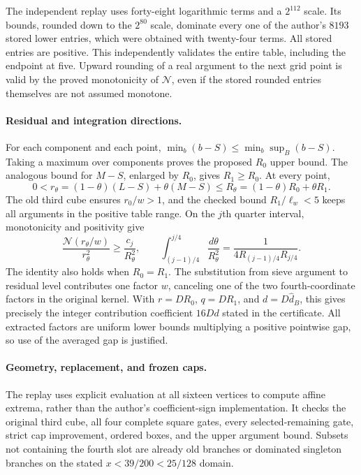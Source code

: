 The independent replay uses forty-eight logarithmic terms and a
$2^{112}$ scale. Its bounds, rounded down to the $2^{80}$ scale,
dominate every one of the author's $8193$ stored lower entries, which
were obtained with twenty-four terms. All stored entries are positive.
This independently validates the entire table, including the endpoint
at five. Upward rounding of a real argument to the next grid point is
valid by the proved monotonicity of $\mathcal N$, even if the stored
rounded entries themselves are not assumed monotone.

\paragraph{Residual and integration directions.}
For each component and each point,
$\min_b(b-S)\le\min_b\sup_B(b-S)$. Taking a maximum over components
proves the proposed $R_0$ upper bound. The analogous bound for $M-S$,
enlarged by $R_0$, gives $R_1\ge R_0$. At every point,
\[
 0<r_\theta=(1-\theta)(L-S)+\theta(M-S)
 \le R_\theta=(1-\theta)R_0+\theta R_1.
\]
The old third cube ensures $r_0/w>1$, and the checked bound
$R_1/\ell_w<5$ keeps all arguments in the positive table range.
On the $j$th quarter interval, monotonicity and positivity give
\[
 \frac{\mathcal N(r_\theta/w)}{r_\theta^2}
 \ge\frac{c_j}{R_\theta^2},\qquad
 \int_{(j-1)/4}^{j/4}\frac{d\theta}{R_\theta^2}
 =\frac1{4R_{(j-1)/4}R_{j/4}}.
\]
The identity also holds when $R_0=R_1$. The substitution from sieve
argument to residual level contributes one factor $w$, canceling one
of the two fourth-coordinate factors in the original kernel. With
$r=DR_0$, $q=DR_1$, and $d=D\widehat d_B$, this gives precisely the
integer contribution coefficient $16D d$ stated in the certificate.
All extracted factors are uniform lower bounds multiplying a positive
pointwise gap, so use of the averaged gap is justified.

\paragraph{Geometry, replacement, and frozen caps.}
The replay uses explicit evaluation at all sixteen vertices to compute
affine extrema, rather than the author's coefficient-sign implementation.
It checks the original third cube, all four complete square gates,
every selected-remaining gate, strict cap improvement, ordered boxes,
and the upper argument bound. Subsets not containing the fourth slot
are already old branches or dominated singleton branches on the stated
$x<39/200<25/128$ domain.

